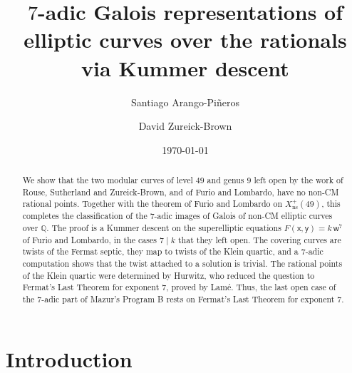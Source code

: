 \documentclass[12pt]{amsart}
\date{\today}
\title{$7$-adic Galois representations of elliptic curves over the rationals
  via Kummer descent}
\author{Santiago Arango-Pi{\~n}eros}
\author{David Zureick-Brown}
\newcommand{\Q}{\mathbb{Q}}
\newcommand{\x}{\mathsf{x}}
\newcommand{\y}{\mathsf{y}}
\newcommand{\w}{\mathsf{w}}
\DeclareMathOperator{\ns}{ns}
\numberwithin{equation}{section}
\theoremstyle{definition}
\begin{document}
\begin{abstract}
  We show that the two modular curves of level $49$ and genus $9$ left open by
  the work of Rouse, Sutherland and Zureick-Brown, and of Furio and Lombardo,
  have no non-CM rational points. Together with the theorem of Furio and
  Lombardo on $X_{\ns}^{+}(49)$, this completes the classification of the
  $7$-adic images of Galois of non-CM elliptic curves over $\Q$. The proof is a
  Kummer descent on the superelliptic equations $F(\x,\y) = k\,\w^{7}$ of Furio
  and Lombardo, in the cases $7 \mid k$ that they left open. The covering
  curves are twists of the Fermat septic, they map to twists of the Klein
  quartic, and a $7$-adic computation shows that the twist attached to a
  solution is trivial. The rational points of the Klein quartic were
  determined by Hurwitz, who reduced the question to Fermat's Last Theorem for
  exponent $7$, proved by Lam\'e. Thus, the last open case of the
  $7$-adic part of Mazur's Program B rests on Fermat's Last Theorem
  for exponent $7$.
\end{abstract}

\maketitle

\setcounter{tocdepth}{1}
\tableofcontents

\section{Introduction}
\label{sec:introduction}
\end{document}
